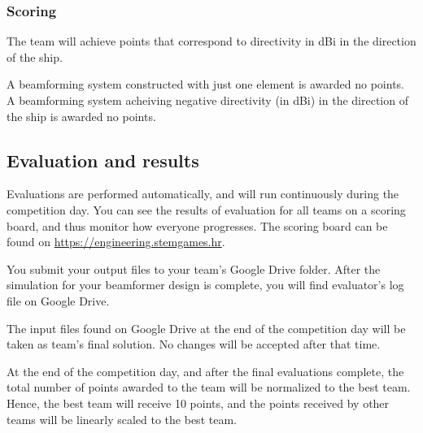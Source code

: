 \documentclass{article}
\begin{document}
\subsubsection*{Scoring}

The team will achieve points that correspond to directivity in dBi in the 
direction of the ship.

A beamforming system constructed with just one element is awarded no points. A 
beamforming system acheiving negative directivity (in dBi) in the direction of 
the ship is awarded no points.

\subsection*{Evaluation and results}

Evaluations are performed automatically, and will run continuously during the 
competition day. You can see the results of evaluation for all teams on a 
scoring board, and thus monitor how everyone progresses. The scoring board can 
be found on \url{https://engineering.stemgames.hr}.

You submit your output files to your team's Google Drive folder.
After the simulation for your beamformer design is complete, you will find 
evaluator's log file on Google Drive.

The input files found on Google Drive at the end of the competition day will be 
taken as team's final solution. No changes will be accepted after that time.

At the end of the competition day, and after the final evaluations complete, 
the total number of points awarded to the team will be normalized to the best 
team. Hence, the best team will receive 10 points, and the points received by 
other teams will be linearly scaled to the best team.
		
\end{document}

